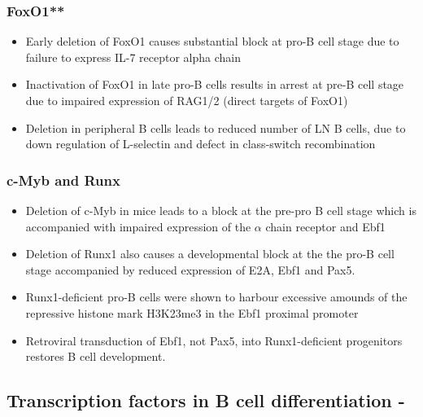 \documentclass[12pt]{article}
\begin{document}
			\subsubsection{FoxO1**}
				
				\begin{itemize}
					\item Early deletion of FoxO1 causes substantial block at pro-B cell stage due to failure to express IL-7 receptor alpha chain 
					\item Inactivation of FoxO1 in late pro-B cells results in arrest at pre-B cell stage due to impaired expression of RAG1/2 (direct targets of FoxO1)
					\item Deletion in peripheral B cells leads to reduced number of LN B cells, due to down regulation of L-selectin and defect in class-switch recombination
				\end{itemize}
			
			\subsubsection{c-Myb and Runx}
				
				\begin{itemize}
					\item Deletion of c-Myb in mice leads to a block at the pre-pro B cell stage which is accompanied with impaired expression of the $\alpha$ chain receptor and Ebf1
					\item Deletion of Runx1 also causes a developmental block at the the pro-B cell stage accompanied by reduced expression of E2A, Ebf1 and Pax5. 
					\item Runx1-deficient pro-B cells were shown to harbour excessive amounds of the repressive histone mark H3K23me3 in the Ebf1 proximal promoter
					\item Retroviral transduction of Ebf1, not Pax5, into Runx1-deficient progenitors restores B cell development. 
				\end{itemize}
			
		\subsection{Transcription factors in B cell differentiation - \citeauthor{Li13} \citeyear{Li13}} 
				
\end{document}
